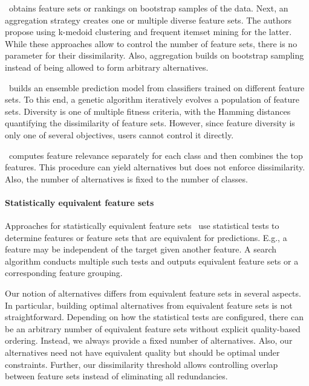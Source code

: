\documentclass{article}
\theoremstyle{definition}
\begin{document}
\cite{woznica2012model}~obtains feature sets or rankings on bootstrap samples of the data.
Next, an aggregation strategy creates one or multiple diverse feature sets.
The authors propose using k-medoid clustering and frequent itemset mining for the latter.
While these approaches allow to control the number of feature sets, there is no parameter for their dissimilarity.
Also, aggregation builds on bootstrap sampling instead of being allowed to form arbitrary alternatives.

\cite{liu2019subspace}~builds an ensemble prediction model from classifiers trained on different feature sets.
To this end, a genetic algorithm iteratively evolves a population of feature sets.
Diversity is one of multiple fitness criteria, with the Hamming distances quantifying the dissimilarity of feature sets.
However, since feature diversity is only one of several objectives, users cannot control it directly.

\cite{guru2018alternative}~computes feature relevance separately for each class and then combines the top features.
This procedure can yield alternatives but does not enforce dissimilarity.
Also, the number of alternatives is fixed to the number of classes.

\paragraph{Statistically equivalent feature sets}

Approaches for statistically equivalent feature sets~\cite{borboudakis2021extending, lagani2017feature} use statistical tests to determine features or feature sets that are equivalent for predictions.
E.g., a feature may be independent of the target given another feature.
A search algorithm conducts multiple such tests and outputs equivalent feature sets or a corresponding feature grouping.

Our notion of alternatives differs from equivalent feature sets in several aspects.
In particular, building optimal alternatives from equivalent feature sets is not straightforward.
Depending on how the statistical tests are configured, there can be an arbitrary number of equivalent feature sets without explicit quality-based ordering.
Instead, we always provide a fixed number of alternatives.
Also, our alternatives need not have equivalent quality but should be optimal under constraints.
Further, our dissimilarity threshold allows controlling overlap between feature sets instead of eliminating all redundancies.
\end{document}
